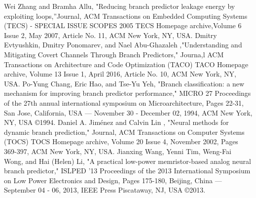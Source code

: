 \documentclass[conference]{IEEEtran}
\begin{document}
\begin{thebibliography}{00}
Wei Zhang and Bramha Allu, "Reducing branch predictor leakage energy by exploiting loops,''Journal, ACM Transactions on Embedded Computing Systems (TECS) - SPECIAL ISSUE SCOPES 2005 TECS Homepage archive,Volume 6 Issue 2, May 2007, Article No. 11, ACM New York, NY, USA.               
 Dmitry Evtyushkin, Dmitry Ponomarev, and Nael Abu-Ghazaleh ,"Understanding and Mitigating Covert Channels Through Branch Predictors," Journa,l ACM Transactions on Architecture and Code Optimization (TACO) TACO Homepage archive,  Volume 13 Issue 1, April 2016,  Article No. 10, ACM New York, NY, USA.
Po-Yung Chang, Eric Hao, and  Tse-Yu Yeh, "Branch classification: a new mechanism for improving branch predictor performance," MICRO 27 Proceedings of the 27th annual international symposium on Microarchitecture, Pages 22-31, San Jose, California, USA — November 30 - December 02, 1994, ACM New York, NY, USA ©1994.
Daniel A. Jiménez and Calvin Lin , "Neural methods for dynamic branch prediction," Journal, ACM Transactions on Computer Systems (TOCS) TOCS Homepage archive, Volume 20 Issue 4, November 2002,  Pages 369-397, ACM New York, NY, USA. 
Jianxing Wang, Yenni Tim, Weng-Fai Wong, and  Hai (Helen) Li, "A practical low-power memristor-based analog neural branch predictor," ISLPED '13 Proceedings of the 2013 International Symposium on Low Power Electronics and Design,  Pages 175-180, Beijing, China — September 04 - 06, 2013, IEEE Press Piscataway, NJ, USA ©2013. 
\end{thebibliography}
\end{document}
